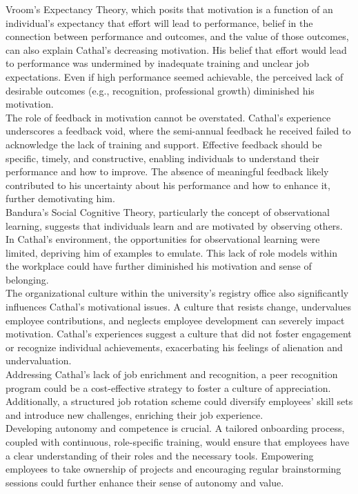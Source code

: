 \documentclass[12pt]{article}
\begin{document}
\begin{flushleft}
Vroom's Expectancy Theory, which posits that motivation is a function of an individual's expectancy that effort will lead to performance, belief in the connection between performance and outcomes, and the value of those outcomes, can also explain Cathal's decreasing motivation. His belief that effort would lead to performance was undermined by inadequate training and unclear job expectations. Even if high performance seemed achievable, the perceived lack of desirable outcomes (e.g., recognition, professional growth) diminished his motivation.\\
The role of feedback in motivation cannot be overstated. Cathal's experience underscores a feedback void, where the semi-annual feedback he received failed to acknowledge the lack of training and support. Effective feedback should be specific, timely, and constructive, enabling individuals to understand their performance and how to improve. The absence of meaningful feedback likely contributed to his uncertainty about his performance and how to enhance it, further demotivating him.\\
Bandura's Social Cognitive Theory, particularly the concept of observational learning, suggests that individuals learn and are motivated by observing others. In Cathal's environment, the opportunities for observational learning were limited, depriving him of examples to emulate. This lack of role models within the workplace could have further diminished his motivation and sense of belonging.\\
The organizational culture within the university's registry office also significantly influences Cathal's motivational issues. A culture that resists change, undervalues employee contributions, and neglects employee development can severely impact motivation. Cathal's experiences suggest a culture that did not foster engagement or recognize individual achievements, exacerbating his feelings of alienation and undervaluation.\\
Addressing Cathal's lack of job enrichment and recognition, a peer recognition program could be a cost-effective strategy to foster a culture of appreciation. Additionally, a structured job rotation scheme could diversify employees' skill sets and introduce new challenges, enriching their job experience.\\
Developing autonomy and competence is crucial. A tailored onboarding process, coupled with continuous, role-specific training, would ensure that employees have a clear understanding of their roles and the necessary tools. Empowering employees to take ownership of projects and encouraging regular brainstorming sessions could further enhance their sense of autonomy and value.\\

\end{flushleft}
\end{document}
